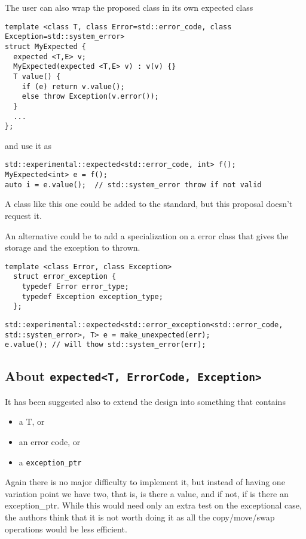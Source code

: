 \documentclass[a4paper,10pt]{article}
\newcommand{\cpp}[1]{\lstinline{#1}}
\begin{document}
The user can also wrap the proposed class in its own expected class

\begin{lstlisting}
template <class T, class Error=std::error_code, class Exception=std::system_error>
struct MyExpected {
  expected <T,E> v;
  MyExpected(expected <T,E> v) : v(v) {}
  T value() {  
    if (e) return v.value();
    else throw Exception(v.error());
  }
  ...
};
\end{lstlisting}

and use it as

\begin{lstlisting}
std::experimental::expected<std::error_code, int> f();
MyExpected<int> e = f();
auto i = e.value();  // std::system_error throw if not valid
\end{lstlisting}

A class like this one could be added to the standard, but this proposal doesn't request it. 

An alternative could be to add a specialization on a error class that gives the storage and the exception to thrown.

\begin{lstlisting}
template <class Error, class Exception>
  struct error_exception {
    typedef Error error_type;
    typedef Exception exception_type;
  };
\end{lstlisting}

\begin{lstlisting}
std::experimental::expected<std::error_exception<std::error_code, std::system_error>, T> e = make_unexpected(err);
e.value(); // will thow std::system_error(err);
\end{lstlisting}


\subsection{About \cpp{expected<T, ErrorCode, Exception>}}

It has been suggested also to extend the design into something that contains 

\begin{itemize}
\item a T, or
\item an error code, or
\item a \cpp{exception_ptr} 
\end{itemize}

Again there is no major difficulty to implement it, but instead of having one variation point we have two, that is, is there a value, and if not, if is there an exception_ptr. While this would need only an extra test on the exceptional case, the authors think that it is not worth doing it as all the copy/move/swap operations would be less efficient. 
\end{document}

